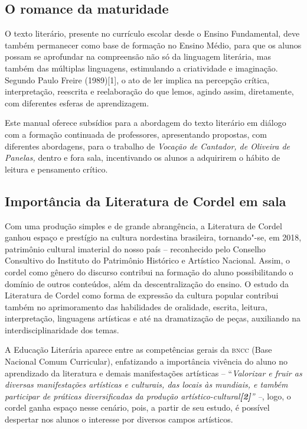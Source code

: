 \documentclass[12pt]{extarticle}
\begin{document}


\subsection{O romance da maturidade}

O texto literário, presente no currículo escolar desde o Ensino
Fundamental, deve também permanecer como base de formação no Ensino
Médio, para que os alunos possam se aprofundar na compreensão não só da
linguagem literária, mas também das múltiplas linguagens, estimulando a
criatividade e imaginação. Segundo Paulo Freire (1989){[}1{]}, o ato de
ler implica na percepção crítica, interpretação, reescrita e
reelaboração do que lemos, agindo assim, diretamente, com diferentes
esferas de aprendizagem.

Este manual oferece subsídios para a abordagem do texto literário em
diálogo com a formação continuada de professores, apresentando
propostas, com diferentes abordagens, para o trabalho de \emph{Vocação
de Cantador, de Oliveira de Panelas,} dentro e fora sala, incentivando
os alunos a adquirirem o hábito de leitura e pensamento crítico.

\subsection{Importância da Literatura de Cordel em sala}

Com uma produção simples e de grande abrangência, a Literatura de Cordel
ganhou espaço e prestígio na cultura nordestina brasileira, tornando"-se,
em 2018, patrimônio cultural imaterial do nosso país -- reconhecido pelo
Conselho Consultivo do Instituto do Patrimônio Histórico e Artístico
Nacional. Assim, o cordel como gênero do discurso contribui na formação
do aluno possibilitando o domínio de outros conteúdos, além da
descentralização do ensino. O estudo da Literatura de Cordel como forma
de expressão da cultura popular contribui também no aprimoramento das
habilidades de oralidade, escrita, leitura, interpretação, linguagens
artísticas e até na dramatização de peças, auxiliando na
interdisciplinaridade dos temas.

A Educação Literária aparece entre as competências gerais da \textsc{bncc} (Base
Nacional Comum Curricular), enfatizando a importância vivência do aluno
no aprendizado da literatura e demais manifestações artísticas --
``\emph{Valorizar e fruir as diversas manifestações artísticas e
culturais, das locais às mundiais, e também participar de práticas
diversificadas da produção artístico-cultural\textbf{{[}2{]}}'' --},
logo, o cordel ganha espaço nesse cenário, pois, a partir de seu estudo,
é possível despertar nos alunos o interesse por diversos campos
artísticos.
\end{document}
